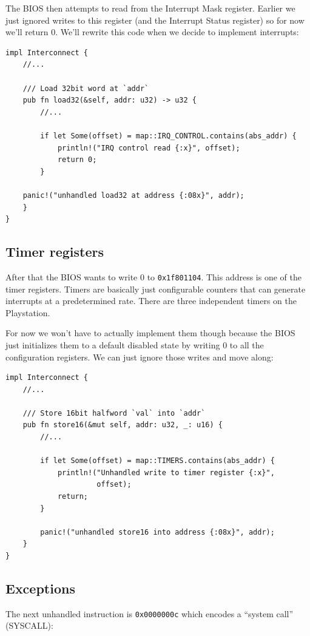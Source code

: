 \documentclass[a4paper]{article}
\newcommand{\code}[1] {\texttt{#1}}
\begin{document}
The BIOS then attempts to read from the Interrupt Mask
register. Earlier we just ignored writes to this register (and the
Interrupt Status register) so for now we'll return 0. We'll rewrite
this code when we decide to implement interrupts:

\begin{lstlisting}
impl Interconnect {
    //...

    /// Load 32bit word at `addr`
    pub fn load32(&self, addr: u32) -> u32 {
        //...

        if let Some(offset) = map::IRQ_CONTROL.contains(abs_addr) {
            println!("IRQ control read {:x}", offset);
            return 0;
        }

	panic!("unhandled load32 at address {:08x}", addr);
    }
}
\end{lstlisting}

\subsection{Timer registers}

After that the BIOS wants to write 0 to \code{0x1f801104}. This
address is one of the timer registers. Timers are basically just
configurable counters that can generate interrupts at a predetermined
rate. There are three independent timers on the Playstation.

For now we won't have to actually implement them though because the
BIOS just initializes them to a default disabled state by writing 0
to all the configuration registers. We can just ignore those writes
and move along:

\begin{lstlisting}
impl Interconnect {
    //...

    /// Store 16bit halfword `val` into `addr`
    pub fn store16(&mut self, addr: u32, _: u16) {
        //...

        if let Some(offset) = map::TIMERS.contains(abs_addr) {
            println!("Unhandled write to timer register {:x}",
                     offset);
            return;
        }

        panic!("unhandled store16 into address {:08x}", addr);
    }
}
\end{lstlisting}

\subsection{Exceptions}

The next unhandled instruction is \code{0x0000000c} which encodes
a ``system call'' (SYSCALL):
\end{document}
